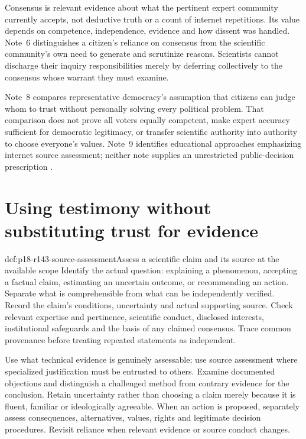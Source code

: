 Consensus is relevant evidence about what the pertinent expert community
currently accepts, not deductive truth or a count of internet repetitions.
Its value depends on competence, independence, evidence and how dissent
was handled. Note~6 distinguishes a citizen's reliance on consensus from
the scientific community's own need to generate and scrutinize reasons.
Scientists cannot discharge their inquiry responsibilities merely by
deferring collectively to the consensus whose warrant they must examine.

Note~8 compares representative democracy's assumption that citizens can
judge whom to trust without personally solving every political problem.
That comparison does not prove all voters equally competent, make expert
accuracy sufficient for democratic legitimacy, or transfer scientific
authority into authority to choose everyone's values. Note~9 identifies
educational approaches emphasizing internet source assessment; neither
note supplies an unrestricted public-decision prescription
\cite[p.~773, notes~6, 8--9]{BrommeGierth2021PublicScience}.

\section{Using testimony without substituting trust for evidence}
\label{sec:p18-r143-use}

\begin{hbmethod}{def:p18-r143-source-assessment}{Assess a scientific claim and its source at the available scope}
Identify the actual question: explaining a phenomenon, accepting a factual
claim, estimating an uncertain outcome, or recommending an action.
Separate what is comprehensible from what can be independently verified.
Record the claim's conditions, uncertainty and actual supporting source.
Check relevant expertise and pertinence, scientific conduct, disclosed
interests, institutional safeguards and the basis of any claimed consensus.
Trace common provenance before treating repeated statements as independent.

Use what technical evidence is genuinely assessable; use source assessment
where specialized justification must be entrusted to others. Examine
documented objections and distinguish a challenged method from contrary
evidence for the conclusion. Retain uncertainty rather than choosing a
claim merely because it is fluent, familiar or ideologically agreeable.
When an action is proposed, separately assess consequences, alternatives,
values, rights and legitimate decision procedures. Revisit reliance when
relevant evidence or source conduct changes.
\end{hbmethod}

